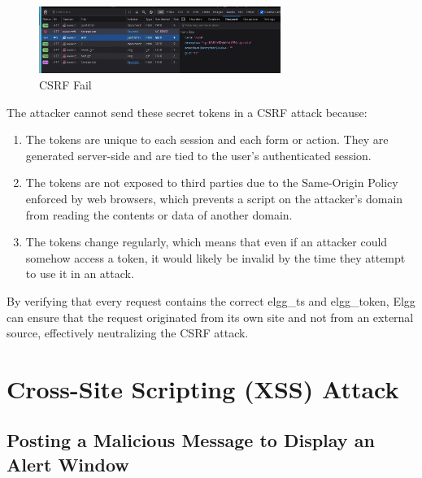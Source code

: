 \documentclass[a4paper,11pt]{article}
\begin{document}
\begin{figure}[h]
    \centering
       \includegraphics[width=0.7\textwidth]{figures/task5/task5.3.png}
    \caption{CSRF Fail}\label{fig:task5.3}
\end{figure}

The attacker cannot send these secret tokens in a CSRF attack because:
\begin{enumerate}
    \item The tokens are unique to each session and each form or action. They are generated server-side and are tied to the user's authenticated session.
    \item The tokens are not exposed to third parties due to the Same-Origin Policy enforced by web browsers, which prevents a script on the attacker’s domain from reading the contents or data of another domain.
    \item The tokens change regularly, which means that even if an attacker could somehow access a token, it would likely be invalid by the time they attempt to use it in an attack.
\end{enumerate}
By verifying that every request contains the correct elgg\_ts and elgg\_token, Elgg can ensure that the request originated from its own site and not from an external source, effectively neutralizing the CSRF attack. 


\section{Cross-Site Scripting (XSS) Attack}
\setcounter{subsection}{2}
\subsection{Posting a Malicious Message to Display an Alert Window}
\end{document}

